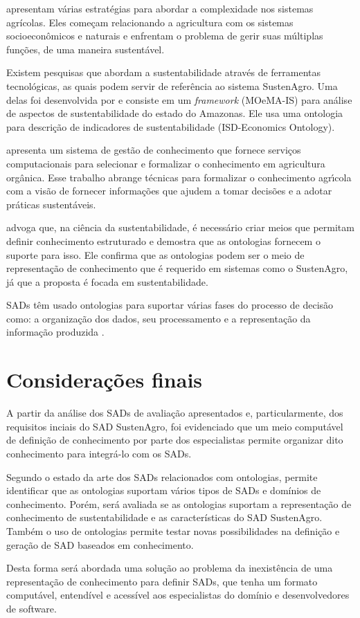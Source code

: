 \citet{Ewert2009546} apresentam várias estratégias para abordar a
complexidade nos sistemas agrícolas. Eles começam relacionando a agricultura
com os sistemas socioeconômicos e naturais e enfrentam o problema
de gerir suas múltiplas funções, de uma maneira sustentável.

Existem pesquisas que abordam a sustentabilidade através de ferramentas
tecnológicas, as quais podem servir de referência ao sistema SustenAgro.
Uma delas foi desenvolvida por \citep{brilhante:2006} e consiste
em um \emph{framework} (MOeMA-IS) para análise de aspectos de sustentabilidade
do estado do Amazonas. Ele usa uma ontologia para descrição de indicadores
de sustentabilidade (\foreignlanguage{english}{ISD-Economics Ontology}).

\citet{soulignac2012knowledge} apresenta um sistema de gestão de
conhecimento que fornece serviços computacionais para selecionar e
formalizar o conhecimento em agricultura orgânica. Esse trabalho abrange
técnicas para formalizar o conhecimento agr\'{ı}cola com a visão de
fornecer informações que ajudem a tomar decisões e a adotar práticas
sustentáveis. 

\citet{kumazawa2009toward} advoga que, na ciência da sustentabilidade,
é necessário criar meios que permitam definir conhecimento estruturado
e demostra que as ontologias fornecem o suporte para isso. Ele confirma
que as ontologias podem ser o meio de representação de conhecimento
que é requerido em sistemas como o SustenAgro, já que a proposta é
focada em sustentabilidade.

SADs têm usado ontologias para suportar várias fases do processo de
decisão como: a organização dos dados, seu processamento e a representação
da informação produzida \citep{Rospocher:2012:ODS:2887638.2887644}.

\section{Considerações finais}

A partir da análise dos SADs de avaliação apresentados e, particularmente,
dos requisitos inciais do SAD SustenAgro, foi evidenciado que um meio
computável de definição de conhecimento por parte dos especialistas
permite organizar dito conhecimento para integrá-lo com os SADs.

Segundo o estado da arte dos SADs relacionados com ontologias, permite
identificar que as ontologias suportam vários tipos de SADs e domínios
de conhecimento. Porém, será avaliada se as ontologias suportam a
representação de conhecimento de sustentabilidade e as características
do SAD SustenAgro. Também o uso de ontologias permite testar novas
possibilidades na definição e geração de SAD baseados em conhecimento.

Desta forma será abordada uma solução ao problema da inexistência
de uma representação de conhecimento para definir SADs, que tenha
um formato computável, entendível e acessível aos especialistas do
domínio e desenvolvedores de software.
